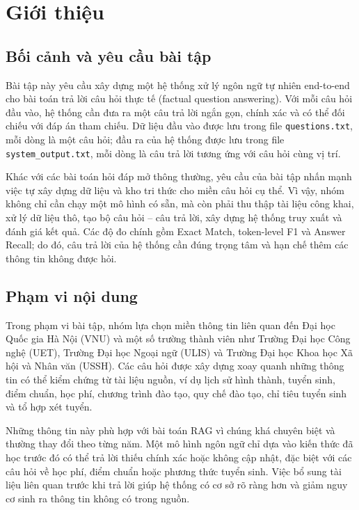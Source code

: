 \documentclass[12pt,a4paper]{report}
\begin{document}
\newpage
{} 
\tableofcontents
\newpage



\fancyhead[L]{\nouppercase{\leftmark}} 
\chapter{Giới thiệu}

\section{Bối cảnh và yêu cầu bài tập}

Bài tập này yêu cầu xây dựng một hệ thống xử lý ngôn ngữ tự nhiên end-to-end cho bài toán trả lời câu hỏi thực tế (factual question answering). Với mỗi câu hỏi đầu vào, hệ thống cần đưa ra một câu trả lời ngắn gọn, chính xác và có thể đối chiếu với đáp án tham chiếu. Dữ liệu đầu vào được lưu trong file \texttt{questions.txt}, mỗi dòng là một câu hỏi; đầu ra của hệ thống được lưu trong file \texttt{system\_output.txt}, mỗi dòng là câu trả lời tương ứng với câu hỏi cùng vị trí.

Khác với các bài toán hỏi đáp mở thông thường, yêu cầu của bài tập nhấn mạnh việc tự xây dựng dữ liệu và kho tri thức cho miền câu hỏi cụ thể. Vì vậy, nhóm không chỉ cần chạy một mô hình có sẵn, mà còn phải thu thập tài liệu công khai, xử lý dữ liệu thô, tạo bộ câu hỏi -- câu trả lời, xây dựng hệ thống truy xuất và đánh giá kết quả. Các độ đo chính gồm Exact Match, token-level F1 và Answer Recall; do đó, câu trả lời của hệ thống cần đúng trọng tâm và hạn chế thêm các thông tin không được hỏi.

\section{Phạm vi nội dung}

Trong phạm vi bài tập, nhóm lựa chọn miền thông tin liên quan đến Đại học Quốc gia Hà Nội (VNU) và một số trường thành viên như Trường Đại học Công nghệ (UET), Trường Đại học Ngoại ngữ (ULIS) và Trường Đại học Khoa học Xã hội và Nhân văn (USSH). Các câu hỏi được xây dựng xoay quanh những thông tin có thể kiểm chứng từ tài liệu nguồn, ví dụ lịch sử hình thành, tuyển sinh, điểm chuẩn, học phí, chương trình đào tạo, quy chế đào tạo, chỉ tiêu tuyển sinh và tổ hợp xét tuyển.

Những thông tin này phù hợp với bài toán RAG vì chúng khá chuyên biệt và thường thay đổi theo từng năm. Một mô hình ngôn ngữ chỉ dựa vào kiến thức đã học trước đó có thể trả lời thiếu chính xác hoặc không cập nhật, đặc biệt với các câu hỏi về học phí, điểm chuẩn hoặc phương thức tuyển sinh. Việc bổ sung tài liệu liên quan trước khi trả lời giúp hệ thống có cơ sở rõ ràng hơn và giảm nguy cơ sinh ra thông tin không có trong nguồn.
\end{document}
